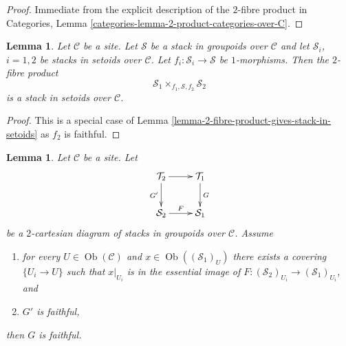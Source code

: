 \documentclass{stacks-project}
\theoremstyle{plain}
\newtheorem{lemma}[subsection]{Lemma}
\theoremstyle{definition}
\theoremstyle{remark}
\numberwithin{equation}{subsection}
\def\Ob{\mathop{\mathrm{Ob}}\nolimits}
\begin{document}
\begin{proof}
Immediate from the explicit description of the $2$-fibre product in
Categories, Lemma \ref{categories-lemma-2-product-categories-over-C}.
\end{proof}

\begin{lemma}
\label{lemma-2-fibre-product-stacks-in-setoids-over-stack-in-groupoids}
Let $\mathcal{C}$ be a site.
Let $\mathcal{S}$ be a stack in groupoids over $\mathcal{C}$ and
let $\mathcal{S}_i$, $i = 1, 2$ be stacks in setoids over $\mathcal{C}$.
Let $f_i : \mathcal{S}_i \to \mathcal{S}$ be $1$-morphisms.
Then the $2$-fibre product
$$
\mathcal{S}_1 \times_{f_1, \mathcal{S}, f_2} \mathcal{S}_2
$$
is a stack in setoids over $\mathcal{C}$.
\end{lemma}

\begin{proof}
This is a special case of
Lemma \ref{lemma-2-fibre-product-gives-stack-in-setoids}
as $f_2$ is faithful.
\end{proof}

\begin{lemma}
\label{lemma-faithful-descent}
Let $\mathcal{C}$ be a site. Let
$$
\xymatrix{
\mathcal{T}_2 \ar[r] \ar[d]_{G'} & \mathcal{T}_1 \ar[d]^G \\
\mathcal{S}_2 \ar[r]^F & \mathcal{S}_1
}
$$
be a $2$-cartesian diagram of stacks in groupoids over $\mathcal{C}$.
Assume
\begin{enumerate}
\item for every $U \in \Ob(\mathcal{C})$ and
$x \in \Ob((\mathcal{S}_1)_U)$ there exists a covering
$\{U_i \to U\}$ such that $x|_{U_i}$ is in the essential
image of $F : (\mathcal{S}_2)_{U_i} \to (\mathcal{S}_1)_{U_i}$, and
\item $G'$ is faithful,
\end{enumerate}
then $G$ is faithful.
\end{lemma}
\end{document}
